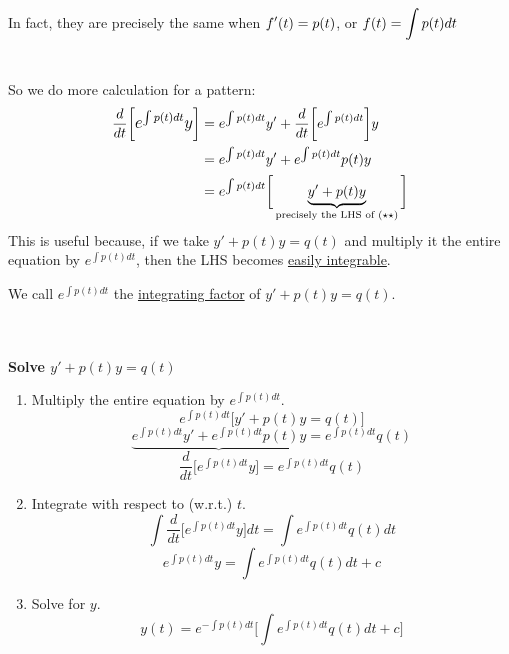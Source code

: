 In fact, they are precisely the same when $\mathlarger{f'(t) = p(t)}$, or $\mathlarger{f(t) = \int p(t)dt}$\\
\redhline\\\\
So we do more calculation for a pattern:
\begin{equation*}
	\begin{split}
		\dfrac{d}{dt}\bigg[\mathlarger{e^{\int p(t)dt}y}\bigg] & = e^{\int p(t)dt}y' + \dfrac{d}{dt}\bigg[e^{\int p(t)dt}\bigg] y\\
		& = e^{\int p(t)dt}y' + e^{\int p(t)dt}p(t)y\\
		& = e^{\int p(t) dt}\bigg[ \underbrace{y' + p(t)y}_{\text{precisely the LHS of $(\star\star)$}}\bigg]
	\end{split}
\end{equation*}
This is useful because, if we take $y' + p(t)y = q(t)$ and multiply it the entire equation by $e^{\int p(t)dt}$, then the LHS becomes \underline{easily integrable}.\\
\begin{center}
	We call $e^{\int p(t)dt}$ the \underline{integrating factor} of $y' + p(t)y = q(t)$.
\end{center}
\redhline\\\\
\textbf{\large Solve $y' + p(t)y = q(t)$}
\begin{enumerate}[label=\textbf{Step \arabic*:}]
	\setlength{\itemindent}{0.8in}
	\item Multiply the entire equation by $e^{\int p(t) dt}$.\\
	\begin{equation*}
		e^{\int p(t) dt}\Big[y' + p(t)y = q(t)\Big]
	\end{equation*}
	\begin{equation*}
		\underbrace{e^{\int p(t) dt}y' + e^{\int p(t) dt} p(t)y} = e^{\int p(t) dt} q(t)
	\end{equation*}
	\begin{equation*}
		\dfrac{d}{dt}\bigg[e^{\int p(t) dt}y\bigg] = e^{\int p(t) dt} q(t)
	\end{equation*}
	\item Integrate with respect to (w.r.t.) $t$.
	\begin{equation*}
		\int \dfrac{d}{dt}\big[e^{\int p(t) dt}y\big]dt = \int e^{\int p(t) dt}q(t) dt
	\end{equation*}
	\begin{equation*}
		e^{\int p(t) dt}y = \int e^{\int p(t) dt} q(t) dt + c
	\end{equation*}
	\item Solve for $y$.
	\begin{equation*}
		y(t) = e^{-\int p(t) dt}\bigg[\int e^{\int p(t) dt} q(t) dt + c\bigg]
	\end{equation*}
\end{enumerate}
